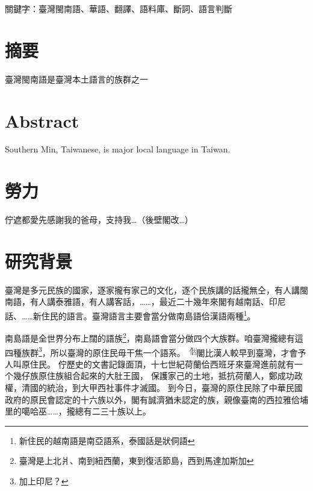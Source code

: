 \documentclass[final,oneside,onecolumn,12pt,a4paper]{book}%
\begin{document}
關鍵字：臺灣閩南語、華語、翻譯、語料庫、斷詞、語言判斷
\newpage

\chapter{摘要}
臺灣閩南語是臺灣本土語言的族群之一

\newpage

\chapter{Abstract}
Southern Min, Taiwanese, is major local language in Taiwan.

\newpage

\chapter{勞力}
佇遮都愛先感謝我的爸母，支持我…（後壁閣改…）

\newpage

\tableofcontents
\listoffigures
\listoftables

\mainmatter

\chapter{研究背景}
\label{章：研究背景}
臺灣是多元民族的國家，逐家攏有家己的文化，逐个民族講的話攏無仝，有人講閩南語，有人講泰雅語，有人講客話，……，最近二十幾年來閣有越南話、印尼話、……新住民的語言。臺灣語言主要會當分做南島語佮漢語兩種\footnote{新住民的越南語是南亞語系，泰國話是狀侗語}。

南島語是全世界分布上闊的語族\footnote{臺灣是上北爿、南到紐西蘭，東到復活節島，西到馬達加斯加}，南島語會當分做四个大族群\cite{李壬癸}。咱臺灣攏總有這四種族群\footnote{加上印尼？}，所以臺灣的原住民毋干焦一个語系。
\includegraphics[height=1em]{字/⿰因}閣比漢人較早到臺灣，才會予人叫原住民。
佇歷史的文書記錄面頂，十七世紀荷蘭佮西班牙來臺灣進前就有一个幾仔族原住族組合起來的大肚王國\cite{大肚王國}，
保護家己的土地，抵抗荷蘭人，鄭成功政權，清國的統治，到大甲西社事件才滅國。
到今日，臺灣的原住民除了中華民國政府的原民會認定的十六族以外，閣有誠濟猶未認定的族，親像臺南的西拉雅佮埔里的噶哈巫……，攏總有二三十族以上。
\end{document}

